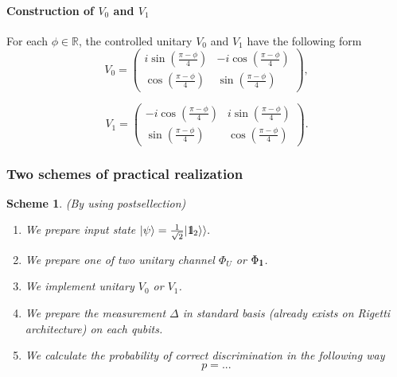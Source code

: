 \documentclass[preprint,12pt, a4paper]{elsarticle}
\newcommand{\ket}[1]{\ensuremath{|#1\rangle}}
\newcommand{\1}{{\rm 1\hspace{-0.9mm}l}}
\newcommand{\Id}{{\rm 1\hspace{-0.9mm}l}}
\newtheorem{scheme}{Scheme}
\begin{document}



\paragraph{Construction of $V_0$ and $V_1$}
	For each $\phi \in \mathbb{R}$,  the controlled unitary $V_0$ and $V_1$ have the following form
	\begin{equation}
	V_0 = \left(\begin{array}{cc}i \sin\left( \frac{\pi - \phi}{4} \right)&-i \cos\left( \frac{\pi - \phi}{4} \right)\\ \cos\left( \frac{\pi - \phi}{4}\right)& \sin\left( \frac{\pi - \phi}{4} \right)\end{array}\right),
	\end{equation}
	
		\begin{equation}
	V_1 = \left(\begin{array}{cc}-i \cos\left(\frac{\pi - \phi}{4}\right) &i \sin\left( \frac{\pi - \phi}{4}\right)\\\sin\left( \frac{\pi - \phi}{4} \right) &  \cos\left( \frac{\pi - \phi}{4} \right) \end{array}\right).
	\end{equation}


\subsubsection{Two schemes of practical realization}

\begin{scheme}(By using postsellection)

%	
\begin{enumerate}
\item We prepare input state $\ket{\psi} = \frac{1}{\sqrt{2} } | \Id_2 \rangle 
\rangle. $
\item We prepare one of two unitary channel $\Phi_{U} $ or $\Phi_{\1}$. 
\item We implement unitary $V_0 $ or $ V_1$.
\item We prepare the measurement $\Delta$ in standard basis (already exists on 
Rigetti architecture) on each qubits.
\item We calculate the probability of correct discrimination in the following 
way
\begin{equation}
p = ...
\end{equation}
\end{enumerate}
\end{scheme}
\end{document}
